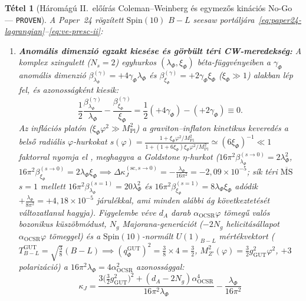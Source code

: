\documentclass[11pt,a4paper]{article}
\newtheorem{theorem}{Tétel}
\begin{document}
\begin{theorem}[Háromágú II.~előírás Coleman--Weinberg és egymezős kinációs No-Go --- \textnormal{{\upshape\texttt{PROVEN}}}]
\label{thm:uv-nogo}
A Paper~24 rögzített $\mathrm{Spin}(10)$ $B-L$ seesaw portáljára~\eqref{eq:paper24-lagrangian}--\eqref{eq:ve-presc-ii}:
\begin{enumerate}
  \item \textbf{Anomális dimenzió egzakt kiesése és görbült téri CW-meredekség:} A komplex szingulett ($N_s = 2$) egyhurkos $(\lambda_\Phi,\xi_\Phi)$ béta-függvényeiben a $\gamma_\Phi$ anomális dimenzió $\beta_{\lambda_\Phi}^{(\gamma)} = +4\gamma_\Phi\lambda_\Phi$ és $\beta_{\xi_\Phi}^{(\gamma)} = +2\gamma_\Phi\xi_\Phi$ ($\xi_\Phi \gg 1$) alakban lép fel, és azonosságként kiesik:
  \begin{equation}
    \frac{1}{2}\frac{\beta_{\lambda_\Phi}^{(\gamma)}}{\lambda_\Phi} - \frac{\beta_{\xi_\Phi}^{(\gamma)}}{\xi_\Phi} = \frac{1}{2}(+4\gamma_\Phi) - (+2\gamma_\Phi) \equiv 0.
    \label{eq:gamma-cancellation}
  \end{equation}
  Az inflációs platón ($\xi_\Phi\varphi^2 \gg M_{\mathrm{Pl}}^2$) a graviton--inflaton kinetikus keveredés a belső radiális $\varphi$-hurkokat $s(\varphi) = \frac{1 + \xi_\Phi\varphi^2/M_{\mathrm{Pl}}^2}{1 + (1 + 6\xi_\Phi)\xi_\Phi\varphi^2/M_{\mathrm{Pl}}^2} \simeq (6\xi_\Phi)^{-1} \ll 1$ faktorral nyomja el \cite{DeSimone2009}, meghagyva a Goldstone $\eta$-hurkot ($16\pi^2\beta_{\lambda_\Phi}^{(s\to 0)} = 2\lambda_\Phi^2$, $16\pi^2\beta_{\xi_\Phi}^{(s\to 0)} = 2\lambda_\Phi\xi_\Phi \implies \Delta\kappa_J^{(\mathrm{sc},s\to 0)} = -\frac{\lambda_\Phi}{16\pi^2} = -2{,}09\times 10^{-5}$; sík téri $\overline{\mathrm{MS}}$ $s = 1$ mellett $16\pi^2\beta_{\lambda_\Phi}^{(s=1)} = 20\lambda_\Phi^2$ és $16\pi^2\beta_{\xi_\Phi}^{(s=1)} = 8\lambda_\Phi\xi_\Phi$ adódik $+\frac{\lambda_\Phi}{8\pi^2} = +4{,}18\times 10^{-5}$ járulékkal, ami minden alábbi ág következtetését változatlanul hagyja). Figyelembe véve $d_A$ darab $\alpha_{\mathrm{OCSR}}\varphi$ tömegű valós bozonikus küszöbmódust, $N_g$ Majorana-generációt ($-2N_g$ helicitásállapot $\alpha_{\mathrm{OCSR}}\varphi$ tömeggel) és a $\mathrm{Spin}(10)$-normált $U(1)_{B-L}$ mértékvektort ($T_{B-L}^{\mathrm{GUT}} = \sqrt{\frac{3}{8}}(B-L) \implies (q_\Phi^{\mathrm{GUT}})^2 = \frac{3}{8}\times 4 = \frac{3}{2}$, $M_{Z'}^2(\varphi) = \frac{3}{2}g_{\mathrm{GUT}}^2\varphi^2$, $+3$ polarizáció) a $16\pi^2\lambda_\Phi = 4\alpha_{\mathrm{OCSR}}^2$ azonossággal:
  \begin{equation}
    \kappa_J = \frac{3\bigl(\frac{3}{2}g_{\mathrm{GUT}}^2\bigr)^2 + (d_A - 2N_g)\alpha_{\mathrm{OCSR}}^4}{16\pi^2\lambda_\Phi} - \frac{\lambda_\Phi}{16\pi^2}

\end{equation}
\end{enumerate}
\end{theorem}
\end{document}
